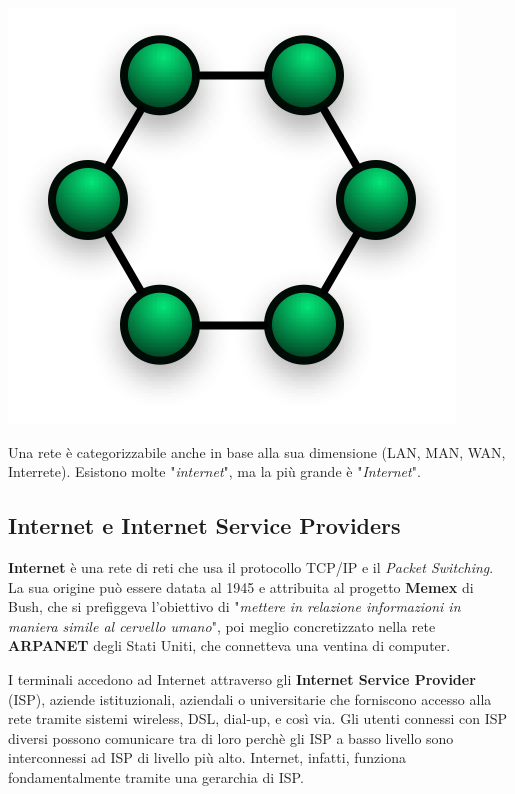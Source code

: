 \begin{itemize}
    \begin{center}
        \includegraphics[scale=0.25]{images/RingNetwork.png}
    \end{center}
\end{itemize}

Una rete è categorizzabile anche in base alla sua dimensione (LAN, MAN, WAN, Interrete). Esistono molte "\textit{internet}", ma la più grande è "\textit{Internet}".

\subsection{Internet e Internet Service Providers}

\textbf{Internet} è una rete di reti che usa il protocollo TCP/IP e il \textit{Packet Switching}. La sua origine può essere datata al 1945 e attribuita al progetto \textbf{Memex} di Bush, che si prefiggeva l'obiettivo di "\textit{mettere in relazione informazioni in maniera simile al cervello umano}", poi meglio concretizzato nella rete \textbf{ARPANET} degli Stati Uniti, che connetteva una ventina di computer.

\vspace{3mm}

I terminali accedono ad Internet attraverso gli \textbf{Internet Service Provider} (ISP), aziende istituzionali, aziendali o universitarie che forniscono accesso alla rete tramite sistemi wireless, DSL, dial-up, e così via. Gli utenti connessi con ISP diversi possono comunicare tra di loro perchè gli ISP a basso livello sono interconnessi ad ISP di livello più alto. Internet, infatti, funziona fondamentalmente tramite una gerarchia di ISP.

